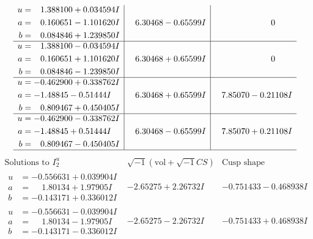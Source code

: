 \documentclass[1p]{elsarticle_modified}
\theoremstyle{definition}
\newcommand{\I}{\sqrt{-1}}
\begin{document}
$$\begin{array}{c|c|c}
\begin{aligned}
u &= \phantom{-}1.388100 + 0.034594 I \\
a &= \phantom{-}0.160651 - 1.101620 I \\
b &= \phantom{-}0.084846 + 1.239850 I\end{aligned}
 & \phantom{-}6.30468 - 0.65599 I & \phantom{-0.000000 } 0 \\ \hline\begin{aligned}
u &= \phantom{-}1.388100 - 0.034594 I \\
a &= \phantom{-}0.160651 + 1.101620 I \\
b &= \phantom{-}0.084846 - 1.239850 I\end{aligned}
 & \phantom{-}6.30468 + 0.65599 I & \phantom{-0.000000 } 0 \\ \hline\begin{aligned}
u &= -0.462900 + 0.338762 I \\
a &= -1.48845 - 0.51444 I \\
b &= \phantom{-}0.809467 + 0.450405 I\end{aligned}
 & \phantom{-}6.30468 + 0.65599 I & \phantom{-}7.85070 - 0.21108 I \\ \hline\begin{aligned}
u &= -0.462900 - 0.338762 I \\
a &= -1.48845 + 0.51444 I \\
b &= \phantom{-}0.809467 - 0.450405 I\end{aligned}
 & \phantom{-}6.30468 - 0.65599 I & \phantom{-}7.85070 + 0.21108 I\\
 \hline 
 \end{array}$$\newpage$$\begin{array}{c|c|c}  
\text{Solutions to }I^u_{2}& \I (\text{vol} + \sqrt{-1}CS) & \text{Cusp shape}\\
 \hline 
\begin{aligned}
u &= -0.556631 + 0.039904 I \\
a &= \phantom{-}1.80134 + 1.97905 I \\
b &= -0.143171 + 0.336012 I\end{aligned}
 & -2.65275 + 2.26732 I & -0.751433 - 0.468938 I \\ \hline\begin{aligned}
u &= -0.556631 - 0.039904 I \\
a &= \phantom{-}1.80134 - 1.97905 I \\
b &= -0.143171 - 0.336012 I\end{aligned}
 & -2.65275 - 2.26732 I & -0.751433 + 0.468938 I \\ \hline\begin{aligned}

\end{aligned}
\end{array}$$
\end{document}
